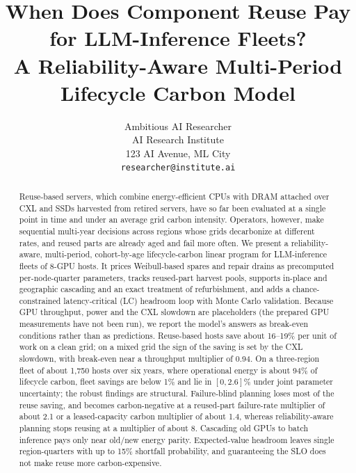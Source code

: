 \documentclass{article} %
\title{When Does Component Reuse Pay for LLM-Inference Fleets? \\ A Reliability-Aware Multi-Period Lifecycle Carbon Model}
\author{Ambitious AI Researcher\\
AI Research Institute\\
123 AI Avenue, ML City\\
\texttt{researcher@institute.ai}
}
\begin{document}
\maketitle

\begin{abstract}
Reuse-based servers, which combine energy-efficient CPUs with DRAM attached over CXL and SSDs harvested from retired servers, have so far been evaluated at a single point in time and under an average grid carbon intensity. Operators, however, make sequential multi-year decisions across regions whose grids decarbonize at different rates, and reused parts are already aged and fail more often. We present a reliability-aware, multi-period, cohort-by-age lifecycle-carbon linear program for LLM-inference fleets of 8-GPU hosts. It prices Weibull-based spares and repair drains as precomputed per-node-quarter parameters, tracks reused-part harvest pools, supports in-place and geographic cascading and an exact treatment of refurbishment, and adds a chance-constrained latency-critical (LC) headroom loop with Monte Carlo validation. Because GPU throughput, power and the CXL slowdown are placeholders (the prepared GPU measurements have not been run), we report the model's answers as break-even conditions rather than as predictions. Reuse-based hosts save about 16--19\% per unit of work on a clean grid; on a mixed grid the sign of the saving is set by the CXL slowdown, with break-even near a throughput multiplier of 0.94. On a three-region fleet of about 1,750 hosts over six years, where operational energy is about 94\% of lifecycle carbon, fleet savings are below 1\% and lie in $[0, 2.6]\%$ under joint parameter uncertainty; the robust findings are structural. Failure-blind planning loses most of the reuse saving, and becomes carbon-negative at a reused-part failure-rate multiplier of about 2.1 or a leased-capacity carbon multiplier of about 1.4, whereas reliability-aware planning stops reusing at a multiplier of about 8. Cascading old GPUs to batch inference pays only near old/new energy parity. Expected-value headroom leaves single region-quarters with up to 15\% shortfall probability, and guaranteeing the SLO does not make reuse more carbon-expensive.
\end{abstract}
\end{document}
